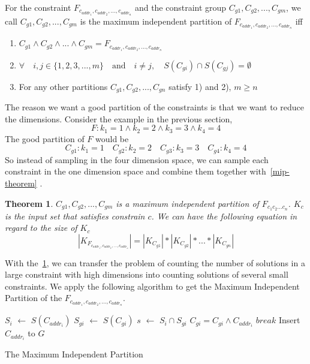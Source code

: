 \begin{definition}
      \label{Goodpartition}
      For the constraint $F_{c_{addr_1},c_{addr_2},...,c_{addr_n}}$ and 
      the constraint group
      $C_{g1}, C_{g2}, ..., C_{gm}$, we call  $C_{g1}, C_{g2}, ..., C_{gm}$
      is the maximum independent partition of $F_{c_{addr_1},c_{addr_2},...,c_{addr_n}}$ iff
      \begin{enumerate}
            \item $C_{g1} \land C_{g2} \land ... \land C_{gm} = F_{c_{addr_1},c_{addr_2},...,c_{addr_n}}$
            \item $\forall \quad i, j \in \{1, 2, 3, ..., m\} \quad \textrm{and} \quad 
                  i \neq j, \quad S(C_{gi}) \cap S(C_{gj}) = \emptyset $
            \item For any other partitions  $C_{g1}, C_{g2}, ..., C_{gn}$ satisfy 1) and
                  2), $m \geq n$    
      \end{enumerate}
      
\end{definition}

The reason we want a good partition of the constraints is that we want to 
reduce the dimensions. Consider the example in the previous section,
$$F: {k_1} = 1\land{k_2} = 2\land{k_3} = 3\land{k_4} = 4$$
The good partition of $F$ would be
$$C_{g1}: {k_1} = 1\quad C_{g2}: {k_2} = 2\quad C_{g3}: {k_3} = 3\quad C_{g4}: {k_4} = 4$$     
So instead of sampling in the four dimension space, we can
sample each constraint in the one dimension space and combine them
together with~\ref{mip-theorem} .
\newtheorem{theorem}{Theorem}[section]
\label{mip-theorem}
\begin{theorem}
      \label{IndependentConstraint}
$C_{g1}, C_{g2}, ..., C_{gm}$ is a maximum independent partition of $F_{c_1c_2...c_n}$.
$K_c$ is the input set that satisfies constrain $c$. We can have the following
equation in regard to the size of $K_c$
$$|K_{F_{c_{addr_1},c_{addr_2},...,c_{addr_n}}}| = |K_{C_{g1}}|*|K_{C_{g2}}|*...*|K_{C_{gn}}|$$
\end{theorem}

With the~\ref{IndependentConstraint}, we can transfer the problem of counting the number of 
solutions in a large constraint with high
dimensions into counting solutions of 
several small constraints. We apply the following algorithm to get the Maximum Independent Partition
of the $F_{c_{addr_1},c_{addr_2},...,c_{addr_n}}$.

\IncMargin{1em}
\begin{algorithm}[h]
\DontPrintSemicolon
{}
{
   $S_i$ $\leftarrow$ $S(C_{addr_i})$ \;
   {
   $S_{gi}$ $\leftarrow$ $S(C_{gi})$ \;
   $s$ $\leftarrow$ $S_i \cap S_{gi}$  \;
   {
      $C_{gi} = C_{gi} \land C_{addr_i}$ \;
      $break$ \;
   }
   Insert $C_{{addr}_i}$ to $G$
   }
}
\caption{The Maximum Independent Partition}
\end{algorithm}
\DecMargin{1em}

